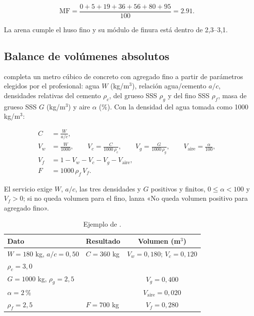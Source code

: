 \begin{equation}
	\mathrm{MF} = \frac{0 + 5 + 19 + 36 + 56 + 80 + 95}{100} = 2.91 .
\end{equation}

La arena cumple el huso fino y su módulo de finura está dentro de 2,3--3,1.

\subsection{Balance de volúmenes absolutos}
\label{sec:con-balance}

 completa un metro cúbico de concreto con agregado fino a
partir de parámetros elegidos por el profesional: agua $W$ (kg/m$^3$), relación agua/cemento $a/c$, densidades
relativas del cemento $\rho_c$, del grueso SSS $\rho_g$ y del fino SSS $\rho_f$, masa de grueso SSS $G$ (kg/m$^3$) y aire
$\alpha$ (\%). Con la densidad del agua tomada como 1000\,kg/m$^3$:

\begin{align}
	C &= \frac{W}{a/c}, \\
	V_w &= \frac{W}{1000}, \qquad V_c = \frac{C}{1000\,\rho_c}, \qquad V_g = \frac{G}{1000\,\rho_g}, \qquad
	V_{\text{aire}} = \frac{\alpha}{100}, \\
	V_f &= 1 - V_w - V_c - V_g - V_{\text{aire}}, \\
	F &= 1000\,\rho_f\,V_f .
\end{align}

El servicio exige $W$, $a/c$, las tres densidades y $G$ positivos y finitos, $0 \le \alpha < 100$ y $V_f > 0$; si no
queda volumen para el fino, lanza «No queda volumen positivo para agregado fino».

\begin{table}[H]
	\centering
	\caption{Ejemplo de .}
	\label{tab:con-ejemplo-balance}
	\begin{tabular}{L{4.4cm}L{4.4cm}c}
		\hline
		\textbf{Dato} & \textbf{Resultado} & \textbf{Volumen (m$^3$)} \\ \hline
		$W = 180$ kg, $a/c = 0{,}50$ & $C = 360$ kg & $V_w = 0{,}180$; $V_c = 0{,}120$ \\
		$\rho_c = 3{,}0$ & & \\
		$G = 1000$ kg, $\rho_g = 2{,}5$ & & $V_g = 0{,}400$ \\
		$\alpha = 2$\,\% & & $V_{\text{aire}} = 0{,}020$ \\
		$\rho_f = 2{,}5$ & $F = 700$ kg & $V_f = 0{,}280$ \\
		\hline
	\end{tabular}
\end{table}


